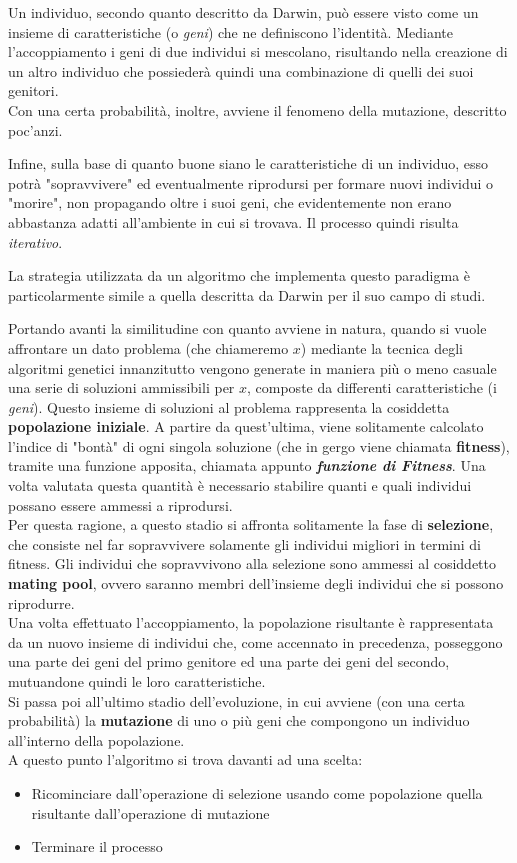     Un individuo, secondo quanto descritto da Darwin, può essere visto come un insieme di caratteristiche (o \textit{geni}) che ne definiscono l'identità. Mediante l'accoppiamento i geni di due individui si mescolano, risultando nella creazione di un altro individuo che possiederà quindi una combinazione di quelli dei suoi genitori. \\
    Con una certa probabilità, inoltre, avviene il fenomeno della mutazione, descritto poc'anzi.

    Infine, sulla base di quanto buone siano le caratteristiche di un individuo, esso potrà "sopravvivere" ed eventualmente riprodursi per formare nuovi individui o "morire", non propagando oltre i suoi geni, che evidentemente non erano abbastanza adatti all'ambiente in cui si trovava. Il processo quindi risulta \textit{iterativo}.

    La strategia utilizzata da un algoritmo che implementa questo paradigma è particolarmente simile a quella descritta da Darwin per il suo campo di studi.

    Portando avanti la similitudine con quanto avviene in natura, quando si vuole affrontare un dato problema (che chiameremo $x$) mediante la tecnica degli algoritmi genetici innanzitutto vengono generate in maniera più o meno casuale una serie di soluzioni ammissibili per $x$, composte da differenti caratteristiche (i \textit{geni}). Questo insieme di soluzioni al problema rappresenta la cosiddetta \textbf{popolazione iniziale}. A partire da quest'ultima, viene solitamente calcolato l'indice di "bontà" di ogni singola soluzione (che in gergo viene chiamata \textbf{fitness}), tramite una funzione apposita, chiamata appunto \textbf{\textit{funzione di Fitness}}. Una volta valutata questa quantità è necessario stabilire quanti e quali individui possano essere ammessi a riprodursi. \\
    Per questa ragione, a questo stadio si affronta solitamente la fase di \textbf{selezione}, che consiste nel far sopravvivere solamente gli individui migliori in termini di fitness. Gli individui che sopravvivono alla selezione sono ammessi al cosiddetto \textbf{mating pool}, ovvero saranno membri dell'insieme degli individui che si possono riprodurre. \\
    Una volta effettuato l'accoppiamento, la popolazione risultante è rappresentata da un nuovo insieme di individui che, come accennato in precedenza, posseggono una parte dei geni del primo genitore ed una parte dei geni del secondo, mutuandone quindi le loro caratteristiche. \\
    Si passa poi all'ultimo stadio dell'evoluzione, in cui avviene (con una certa probabilità) la \textbf{mutazione} di uno o più geni che compongono un individuo all'interno della popolazione. \\
    A questo punto l'algoritmo si trova davanti ad una scelta: 
    \begin{itemize}
        \item Ricominciare dall'operazione di selezione usando come popolazione quella risultante dall'operazione di mutazione
        \item Terminare il processo
    \end{itemize}

